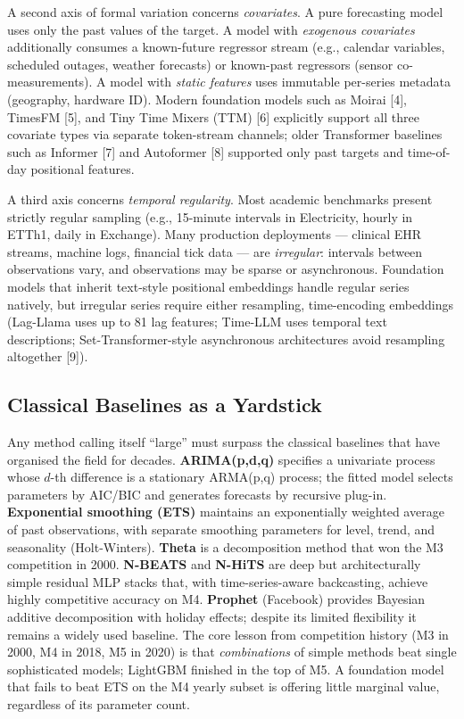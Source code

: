 A second axis of formal variation concerns \emph{covariates}. A pure forecasting model uses only the past values of the target. A model with \emph{exogenous covariates} additionally consumes a known-future regressor stream (e.g., calendar variables, scheduled outages, weather forecasts) or known-past regressors (sensor co-measurements). A model with \emph{static features} uses immutable per-series metadata (geography, hardware ID). Modern foundation models such as Moirai {[}4{]}, TimesFM {[}5{]}, and Tiny Time Mixers (TTM) {[}6{]} explicitly support all three covariate types via separate token-stream channels; older Transformer baselines such as Informer {[}7{]} and Autoformer {[}8{]} supported only past targets and time-of-day positional features.

A third axis concerns \emph{temporal regularity}. Most academic benchmarks present strictly regular sampling (e.g., 15-minute intervals in Electricity, hourly in ETTh1, daily in Exchange). Many production deployments --- clinical EHR streams, machine logs, financial tick data --- are \emph{irregular}: intervals between observations vary, and observations may be sparse or asynchronous. Foundation models that inherit text-style positional embeddings handle regular series natively, but irregular series require either resampling, time-encoding embeddings (Lag-Llama uses up to 81 lag features; Time-LLM uses temporal text descriptions; Set-Transformer-style asynchronous architectures avoid resampling altogether {[}9{]}).

\subsection{Classical Baselines as a Yardstick}\label{classical-baselines-as-a-yardstick}

Any method calling itself ``large'' must surpass the classical baselines that have organised the field for decades. \textbf{ARIMA(p,d,q)} specifies a univariate process whose \(d\)-th difference is a stationary ARMA(p,q) process; the fitted model selects parameters by AIC/BIC and generates forecasts by recursive plug-in. \textbf{Exponential smoothing (ETS)} maintains an exponentially weighted average of past observations, with separate smoothing parameters for level, trend, and seasonality (Holt-Winters). \textbf{Theta} is a decomposition method that won the M3 competition in 2000. \textbf{N-BEATS} and \textbf{N-HiTS} are deep but architecturally simple residual MLP stacks that, with time-series-aware backcasting, achieve highly competitive accuracy on M4. \textbf{Prophet} (Facebook) provides Bayesian additive decomposition with holiday effects; despite its limited flexibility it remains a widely used baseline. The core lesson from competition history (M3 in 2000, M4 in 2018, M5 in 2020) is that \emph{combinations} of simple methods beat single sophisticated models; LightGBM finished in the top of M5. A foundation model that fails to beat ETS on the M4 yearly subset is offering little marginal value, regardless of its parameter count.

